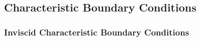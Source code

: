 % 

















\subsection{Characteristic Boundary Conditions}

\subsubsection{Inviscid Characteristic Boundary Conditions}

